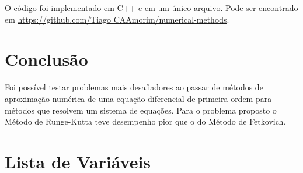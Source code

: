 \documentclass[final,5p]{elsarticle}
\numberwithin{equation}{section}
\begin{document}


        O código foi implementado em C++ e em um único arquivo. Pode ser encontrado em \href{https://github.com/TiagoCAAmorim/numerical-methods/blob/main/10_GaussElim/10_GaussElim.cpp}{https://github.com/Tiago CAAmorim/numerical-methods}.

    \section{Conclusão}

        Foi possível testar problemas mais desafiadores ao passar de métodos de aproximação numérica de uma equação diferencial de primeira ordem para métodos que resolvem um sistema de equações. Para o problema proposto o Método de Runge-Kutta teve desempenho pior que o do Método de Fetkovich.



\appendix

\section{Lista de Variáveis}
\end{document}
